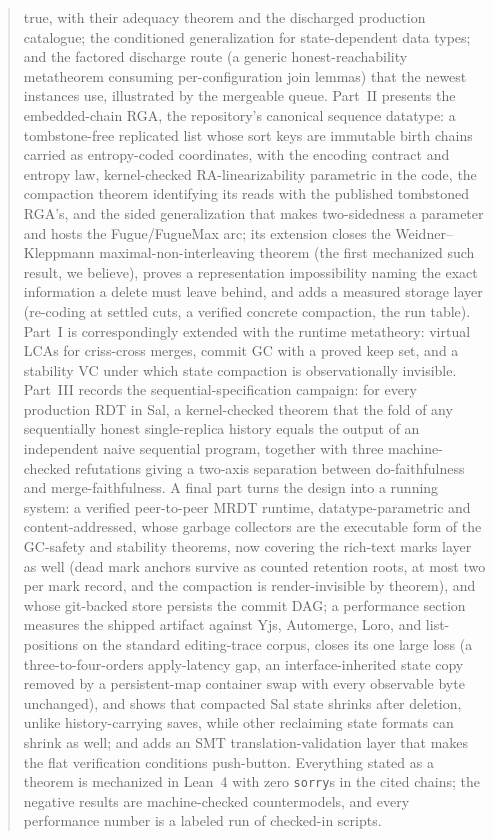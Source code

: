 \documentclass[11pt]{article}
\newcommand{\lean}[1]{\texttt{#1}}
\begin{document}
\begin{abstract}
true, with their adequacy theorem and the discharged production
catalogue; the conditioned generalization for state-dependent data
types; and the factored discharge route (a generic honest-reachability
metatheorem consuming per-configuration join lemmas) that the newest
instances use, illustrated by the mergeable queue. Part~II
presents the embedded-chain RGA, the repository's canonical sequence
datatype: a tombstone-free replicated list whose sort keys are immutable
birth chains carried as entropy-coded coordinates, with the encoding
contract and entropy law, kernel-checked RA-linearizability parametric
in the code, the compaction theorem identifying its reads with the
published tombstoned RGA's, and the sided generalization that makes
two-sidedness a parameter and hosts the Fugue/FugueMax arc; its
extension closes the Weidner--Kleppmann maximal-non-interleaving
theorem (the first mechanized such result, we believe), proves a
representation impossibility naming the exact information a delete must
leave behind, and adds a measured storage layer (re-coding at settled
cuts, a verified concrete compaction, the run table). Part~I is
correspondingly extended with the runtime metatheory: virtual LCAs for
criss-cross merges, commit GC with a proved keep set, and a stability
VC under which state compaction is observationally invisible. Part~III
records the sequential-specification campaign: for every production RDT
in Sal, a kernel-checked theorem that the fold of any sequentially
honest single-replica history equals the output of an independent naive
sequential program, together with three machine-checked refutations
giving a two-axis separation between do-faithfulness and
merge-faithfulness. A final part turns the design into a running system:
a verified peer-to-peer MRDT runtime, datatype-parametric and
content-addressed, whose garbage collectors are the executable form of
the GC-safety and stability theorems, now covering the rich-text marks
layer as well (dead mark anchors survive as counted retention roots,
at most two per mark record, and the compaction is render-invisible by
theorem), and whose git-backed store persists
the commit DAG; a performance section measures the shipped artifact
against Yjs, Automerge, Loro, and list-positions on the standard
editing-trace corpus, closes its one large loss (a three-to-four-orders
apply-latency gap, an interface-inherited state copy removed by a
persistent-map container swap with every observable byte unchanged), and
shows that compacted Sal state shrinks after deletion, unlike
history-carrying saves, while other reclaiming state formats can shrink as
well; and adds an SMT
translation-validation layer that makes the flat verification conditions
push-button. Everything stated as a theorem is mechanized in
Lean~4 with zero \lean{sorry}s in the cited chains; the negative results
are machine-checked countermodels, and every performance number is a
labeled run of checked-in scripts.
\fi\fi
\end{abstract}
\end{document}
